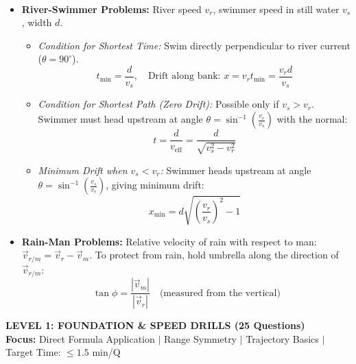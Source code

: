 \documentclass[11pt,a4paper]{article}
\begin{document}
\vspace{5pt}
\noindent{\large\textbf{\textsf{\textcolor{primaryDark}{2.5 Relative Motion in 2D: River-Swimmer \& Rain-Man}}}}\\[3pt]
\begin{itemize}[leftmargin=14pt,itemsep=2pt]
  \item \textbf{River-Swimmer Problems:} River speed $v_r$, swimmer speed in still water $v_s$, width $d$.
  \begin{itemize}[leftmargin=12pt,itemsep=1pt]
    \item \textit{Condition for Shortest Time:} Swim directly perpendicular to river current ($\theta = 90^\circ$).
    \[
      t_{\min} = \frac{d}{v_s}, \quad \text{Drift along bank: } x = v_r t_{\min} = \frac{v_r d}{v_s}
    \]
    \item \textit{Condition for Shortest Path (Zero Drift):} Possible only if $v_s > v_r$. Swimmer must head upstream at angle $\theta = \sin^{-1}\left(\frac{v_r}{v_s}\right)$ with the normal:
    \[
      t = \frac{d}{v_{\text{eff}}} = \frac{d}{\sqrt{v_s^2 - v_r^2}}
    \]
    \item \textit{Minimum Drift when $v_s < v_r$:} Swimmer heads upstream at angle $\theta = \sin^{-1}\left(\frac{v_s}{v_r}\right)$, giving minimum drift:
    \[
      x_{\min} = d\sqrt{\left(\frac{v_r}{v_s}\right)^2 - 1}
    \]
  \end{itemize}
  \item \textbf{Rain-Man Problems:} Relative velocity of rain with respect to man: $\vec{v}_{r/m} = \vec{v}_r - \vec{v}_m$.
  To protect from rain, hold umbrella along the direction of $\vec{v}_{r/m}$:
  \[
    \tan\phi = \frac{|\vec{v}_m|}{|\vec{v}_r|} \quad \text{(measured from the vertical)}
  \]
\end{itemize}

\newpage

\begin{tcolorbox}[l1banner]
  {\Large \textbf{\textsf{LEVEL 1: FOUNDATION \& SPEED DRILLS (25 Questions)}}}\\[2pt]
  {\footnotesize \textbf{Focus:} Direct Formula Application $\vert$ Range Symmetry $\vert$ Trajectory Basics $\vert$ Target Time: $\le 1.5$ min/Q}
\end{tcolorbox}
\vspace{6pt}
\end{document}
